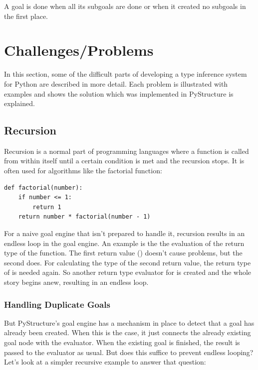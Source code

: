 \documentclass[12pt,halfparskip,DIV11,BCOR10mm]{scrreprt}
\begin{document}
A goal is done when all its subgoals are done or when it created no subgoals in the first place.



\section{Challenges/Problems}

In this section, some of the difficult parts of developing a type inference system for Python are described in more detail. Each problem is illustrated with examples and shows the solution which was implemented in PyStructure is explained.

\subsection{Recursion}


Recursion is a normal part of programming languages where a function is called from within itself until a certain condition is met and the recursion stops. It is often used for algorithms like the factorial function:

\begin{lstlisting}
def factorial(number):
    if number <= 1:
        return 1
    return number * factorial(number - 1)
\end{lstlisting}

For a naive goal engine that isn't prepared to handle it, recursion results in an endless loop in the goal engine. An example is the the evaluation of the return type of the  function. The first return value () doesn't cause problems, but the second does. For calculating the type of the second return value, the return type of  is needed again. So another return type evaluator for  is created and the whole story begins anew, resulting in an endless loop.

\subsubsection{Handling Duplicate Goals}

But PyStructure's goal engine has a mechanism in place to detect that a goal has already been created. When this is the case, it just connects the already existing goal node with the evaluator. When the existing goal is finished, the result is passed to the evaluator as usual. But does this suffice to prevent endless looping? Let's look at a simpler recursive example to answer that question:
\end{document}
